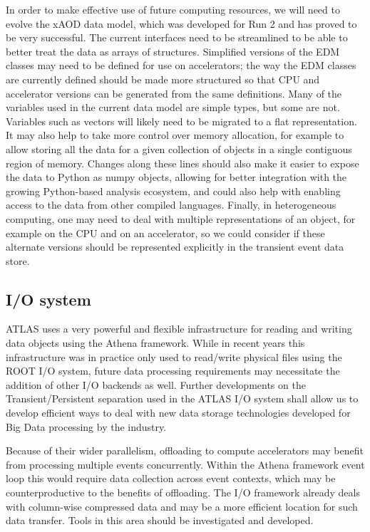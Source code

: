In order to make effective use of future computing resources, we will need to evolve the xAOD data model, which was developed for Run 2 and has proved to be very successful. The current interfaces need to be streamlined to be able to better treat the data as arrays of structures. Simplified versions of the EDM classes may need to be defined for use on accelerators; the way the EDM classes are currently defined should be made more structured so that CPU and accelerator versions can be generated from the same definitions.  Many of the variables used in the current data model are simple types, but some are not.  Variables such as vectors will likely need to be migrated to a flat representation.  It may also help to take more control over memory allocation, for example to allow storing all the data for a given collection of objects in a single contiguous region of memory.  Changes along these lines should also make it easier to expose the data to Python as numpy objects, allowing for better integration with the growing Python-based analysis ecosystem, and could also help with enabling access to the data from other compiled languages. Finally, in heterogeneous computing, one may need to deal with multiple representations of an object, for example on the CPU and on an accelerator, so we could consider if these alternate versions should be represented explicitly in the transient event data store.

\subsection{I/O system}

ATLAS uses a very powerful and flexible infrastructure for reading and writing data objects using the Athena framework. While in recent years this infrastructure was in practice only used to read/write physical files using the ROOT I/O system, future data processing requirements may necessitate the addition of other I/O backends as well. Further developments on the Transient/Persistent separation used in the ATLAS I/O system shall allow us to develop efficient ways to deal with new data storage technologies developed for Big Data processing by the industry.

Because of their wider parallelism, offloading to compute accelerators may benefit from processing multiple events concurrently. Within the Athena framework event loop this would require data collection across event contexts, which may be counterproductive to the benefits of offloading. The I/O framework already deals with column-wise compressed data and may be a more efficient location for such data transfer. Tools in this area should be investigated and developed.

